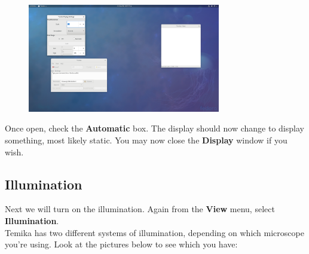 \documentclass{article}
\begin{document}
\begin{figure}[h]
\centering
\includegraphics[width=0.75\textwidth]{display}
\end{figure}

Once open, check the \textbf{Automatic} box. The display should now change to display something, most likely static. You may now close the \textbf{Display} window if you wish.

\newpage

\subsection{Illumination}

Next we will turn on the illumination. Again from the \textbf{View} menu, select \textbf{Illumination}.\\

Temika has two different systems of illumination, depending on which microscope you're using. Look at the pictures below to see which you have:
\end{document}
